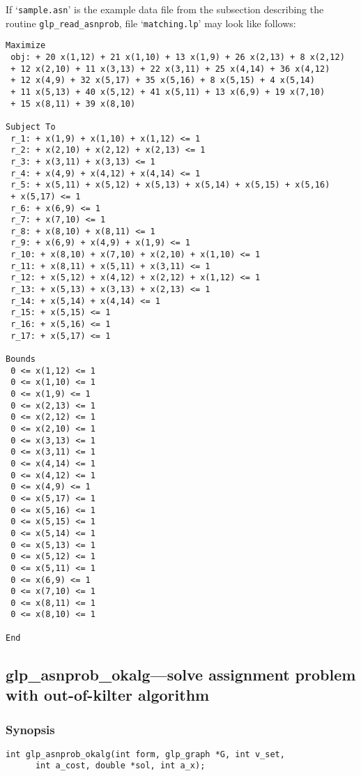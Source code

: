 If `\verb|sample.asn|' is the example data file from the subsection
describing the routine \verb|glp_read_asnprob|, file
`\verb|matching.lp|' may look like follows:

\begin{footnotesize}
\begin{verbatim}
Maximize
 obj: + 20 x(1,12) + 21 x(1,10) + 13 x(1,9) + 26 x(2,13) + 8 x(2,12)
 + 12 x(2,10) + 11 x(3,13) + 22 x(3,11) + 25 x(4,14) + 36 x(4,12)
 + 12 x(4,9) + 32 x(5,17) + 35 x(5,16) + 8 x(5,15) + 4 x(5,14)
 + 11 x(5,13) + 40 x(5,12) + 41 x(5,11) + 13 x(6,9) + 19 x(7,10)
 + 15 x(8,11) + 39 x(8,10)

Subject To
 r_1: + x(1,9) + x(1,10) + x(1,12) <= 1
 r_2: + x(2,10) + x(2,12) + x(2,13) <= 1
 r_3: + x(3,11) + x(3,13) <= 1
 r_4: + x(4,9) + x(4,12) + x(4,14) <= 1
 r_5: + x(5,11) + x(5,12) + x(5,13) + x(5,14) + x(5,15) + x(5,16)
 + x(5,17) <= 1
 r_6: + x(6,9) <= 1
 r_7: + x(7,10) <= 1
 r_8: + x(8,10) + x(8,11) <= 1
 r_9: + x(6,9) + x(4,9) + x(1,9) <= 1
 r_10: + x(8,10) + x(7,10) + x(2,10) + x(1,10) <= 1
 r_11: + x(8,11) + x(5,11) + x(3,11) <= 1
 r_12: + x(5,12) + x(4,12) + x(2,12) + x(1,12) <= 1
 r_13: + x(5,13) + x(3,13) + x(2,13) <= 1
 r_14: + x(5,14) + x(4,14) <= 1
 r_15: + x(5,15) <= 1
 r_16: + x(5,16) <= 1
 r_17: + x(5,17) <= 1

Bounds
 0 <= x(1,12) <= 1
 0 <= x(1,10) <= 1
 0 <= x(1,9) <= 1
 0 <= x(2,13) <= 1
 0 <= x(2,12) <= 1
 0 <= x(2,10) <= 1
 0 <= x(3,13) <= 1
 0 <= x(3,11) <= 1
 0 <= x(4,14) <= 1
 0 <= x(4,12) <= 1
 0 <= x(4,9) <= 1
 0 <= x(5,17) <= 1
 0 <= x(5,16) <= 1
 0 <= x(5,15) <= 1
 0 <= x(5,14) <= 1
 0 <= x(5,13) <= 1
 0 <= x(5,12) <= 1
 0 <= x(5,11) <= 1
 0 <= x(6,9) <= 1
 0 <= x(7,10) <= 1
 0 <= x(8,11) <= 1
 0 <= x(8,10) <= 1

End
\end{verbatim}
\end{footnotesize}

\subsection{glp\_asnprob\_okalg---solve assignment problem with
out-of-kilter algorithm}

\subsubsection*{Synopsis}

\begin{verbatim}
int glp_asnprob_okalg(int form, glp_graph *G, int v_set,
      int a_cost, double *sol, int a_x);
\end{verbatim}

